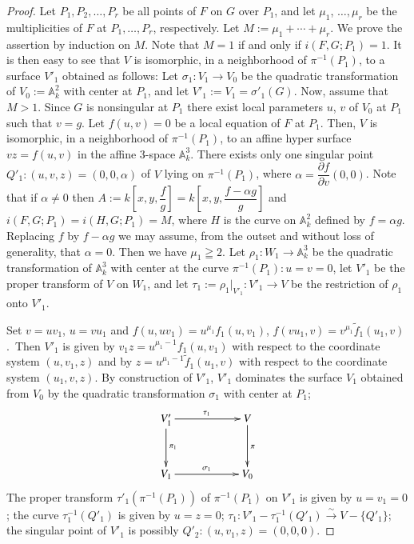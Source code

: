 \begin{proof}
Let $P_{1},P_{2},\ldots,P_{r}$ be all points of $F$ on $G$ over
$P_{1}$, and let $\mu_{1}$, $\ldots,\mu_{r}$ be the multiplicities of $F$
at $P_{1},\ldots,P_{r}$, respectively. Let
$M:=\mu_{1}+\cdots+\mu_{r}$. We prove the assertion by induction on
$M$. Note that $M=1$ if and only if $i(F,G;P_{1})=1$. It is then easy
to see that $V$ is isomorphic, in a neighborhood of $\pi^{-1}(P_{1})$,
to a surface $V'_{1}$ obtained as follows: Let $\sigma_{1}:V_{1}\to
V_{0}$ be the quadratic transformation of $V_{0}:=\mathbb{A}^{2}_{k}$
with center at $P_{1}$, and let $V'_{1}:=V_{1}=\sigma'_{1}(G)$. Now,
assume that $M>1$. Since $G$ is nonsingular at $P_{1}$ there exist
local parameters $u$, $v$ of $V_{0}$ at $P_{1}$ such that $v=g$. Let
$f(u,v)=0$ be a local equation of $F$ at $P_{1}$. Then, $V$ is
isomorphic, in a neighborhood of $\pi^{-1}(P_{1})$, to an affine
hyper surface $vz=f(u,v)$ in the affine $3$-space
$\mathbb{A}^{3}_{k}$. There exists only one singular point
$Q'_{1}:(u,v,z)=(0,0,\alpha)$ of $V$ lying on $\pi^{-1}(P_{1})$, where
$\alpha=\dfrac{\partial f}{\partial v}(0,0)$. Note that if $\alpha\neq
0$ then $A:=k\left[x,y,\dfrac{f}{g}\right]=k \left[x,y, \dfrac{f-\alpha g}{g}\right]$ and
$i(F,G;P_{1})=i(H,G;P_{1})=M$, where $H$ is the curve on
$\mathbb{A}^{2}_{k}$ defined by $f=\alpha g$. Replacing $f$ by
$f-\alpha g$ we may assume, from the outset and without loss of
generality, that $\alpha=0$. Then we have $\mu_{1}\geqq 2$. Let
$\rho_{1}:W_{1}\to \mathbb{A}^{3}_{k}$ be the quadratic transformation
of $\mathbb{A}^{3}_{k}$ with center at the curve
$\pi^{-1}(P_{1}):u=v=0$, let $V'_{1}$ be the proper transform of $V$
on $W_{1}$, and let $\tau_{1}:=\rho_{1}|_{V'_{1}}:V'_{1}\to V$ be the
restriction of $\rho_{1}$ onto $V'_{1}$.

Set $v=uv_{1}$, $u=vu_{1}$ and
$f(u,uv_{1})=u^{\mu_{1}}f_{1}(u,v_{1})$,
$f(vu_{1},v)=v^{\mu_{1}}\widetilde{f}_{1}(u_{1},v)$.\pageoriginale\
Then $V'_{1}$ is given by $v_{1}z=u^{\mu_{1}-1}f_{1}(u,v_{1})$ with
respect to the coordinate system $(u,v_{1},z)$ and by
$z=u^{\mu_{1}-1}\widetilde{f}_{1}(u_{1},v)$ with respect to the
coordinate system $(u_{1},v,z)$. By construction of $V'_{1}$, $V'_{1}$
dominates the surface $V_{1}$ obtained from $V_{0}$ by the quadratic
transformation $\sigma_{1}$ with center at $P_{1}$;
\[
\xymatrix@C=2cm@R=1.2cm{
V'_{1}\ar[d]^{\pi_{1}}\ar[r]^{\tau_{1}} & V\ar[d]^{\pi}\\
V_{1}\ar[r]^{\sigma_{1}} & V_{0}
}
\]
The proper transform $\tau'_{1}(\pi^{-1}(P_{1}))$ of $\pi^{-1}(P_{1})$
on $V'_{1}$ is given by $u=v_{1}=0$; the curve $\tau^{-1}_{1}(Q'_{1})$
is given by $u=z=0$;
$\tau_{1}:V'_{1}-\tau^{-1}_{1}(Q'_{1})\xrightarrow{\sim}V-\{Q'_{1}\}$;
the singular point of $V'_{1}$ is possibly
$Q'_{2}:(u,v_{1},z)=(0,0,0)$.


\end{proof}
